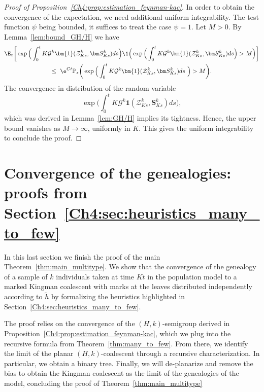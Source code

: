 \begin{refsegment}
\begin{proof}[Proof of Proposition~\ref{Ch4:prop:estimation_feynman-kac}]
  In order to obtain the convergence of the expectation, we need additional uniform integrability.
The test function $\psi$ being bounded, it suffices to treat the case $\psi=1$. Let $M>0$. By Lemma~\ref{lem:bound_GH/H} we have 
\begin{multline*}  
\E_{z}\bigg[\exp\Big(\int_{0}^{t} K \mathcal{G}^k\bm{1}(\mathcal{Z}^k_{Ks}, \bm S^k_{Ks}) ds \Big)\1\Big( \exp\Big(\int_{0}^{t} K \mathcal{G}^k\bm{1}(\mathcal{Z}^k_{Ks}, \bm S^k_{Ks}) ds\Big) >M\Big)\bigg]\\ \leq\ \e^{Ct} \mathbb{P}_{z}\bigg(\exp\Big(\int_{0}^{t} K \mathcal{G}^k\bm{1}(\mathcal{Z}^k_{Ks}, \bm S^k_{Ks}) ds\ \Big) >M\bigg).
\end{multline*}
The convergence in distribution of the random variable
\[
\exp\Big( \int_{0}^{t} K \mathcal{G}^k\bm{1}(\mathcal{Z}^k_{Ks}, \bm S^k_{Ks}) ds\Big),
\]
which was derived in Lemma~\ref{lem:GH/H} implies its tightness. Hence, the upper
bound vanishes as $M\to\infty$, uniformly in $K$. This gives the uniform integrability to conclude the proof.
\end{proof}

\section{Convergence of the genealogies: proofs from Section~\ref{Ch4:sec:heuristics_many_to_few}}\label{Ch4:sec:fin_preuve}


In this last section we finish the proof of the main Theorem~\ref{thm:main_multitype}. We show that the convergence of the genealogy of a sample of $k$ individuals taken at time $Kt$ in the population model to a marked Kingman coalescent with marks at the leaves distributed independently according to $\tilde h$ by formalizing the heuristics highlighted in Section~\ref{Ch4:sec:heuristics_many_to_few}. 


The proof relies on the convergence of the $(H,k)$-semigroup derived in Proposition~\ref{Ch4:prop:estimation_feynman-kac}, which we plug into the recursive formula from Theorem~\eqref{thm:many_to_few}. From there, we identify the limit of the planar $(H,k)$-coalescent through 
a recursive characterization. In particular, we obtain a binary tree. Finally, we will de-planarize and remove the bias to obtain the Kingman coalescent as the limit of the genealogies of the model, concluding the proof of Theorem~\ref{thm:main_multitype}







\end{refsegment}
